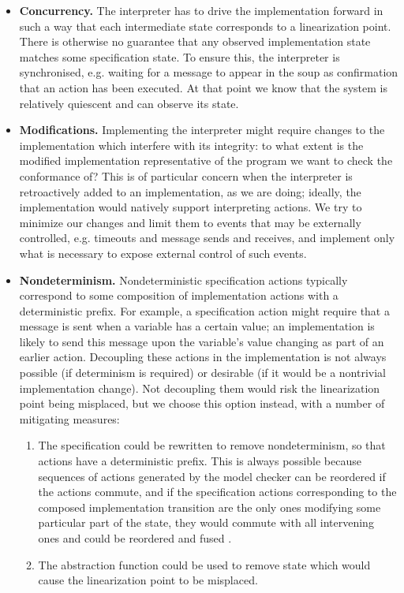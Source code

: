 \documentclass[a4paper]{article}
\begin{document}
\begin{itemize}
\item \textbf{Concurrency.} The interpreter has to drive the implementation forward in such a way that each intermediate state corresponds to a linearization point.
%
There is otherwise no guarantee that any observed implementation state matches some specification state.
%
To ensure this, the interpreter is synchronised, e.g. waiting for a message to appear in the soup as confirmation that an action has been executed.
%
At that point we know that the system is relatively quiescent and can observe its state.

\item \textbf{Modifications.} Implementing the interpreter might require changes to the implementation which interfere with its integrity: to what extent is the modified implementation representative of the program we want to check the conformance of?
%
This is of particular concern when the interpreter is retroactively added to an implementation, as we are doing; ideally, the implementation would natively support interpreting actions.
%
We try to minimize our changes and limit them to events that may be externally controlled, e.g. timeouts and message sends and receives, and implement only what is necessary to expose external control of such events.


\item \textbf{Nondeterminism.} Nondeterministic specification actions typically correspond to some composition of implementation actions with a deterministic prefix.
%
For example, a specification action might require that a message is sent when a variable has a certain value; an implementation is likely to send this message upon the variable's value changing as part of an earlier action.
%
Decoupling these actions in the implementation is not always possible (if determinism is required) or desirable (if it would be a nontrivial implementation change).
%
Not decoupling them would risk the linearization point being misplaced, but we choose this option instead, with a number of mitigating measures:

\begin{enumerate}
\item The specification could be rewritten to remove nondeterminism, so that actions have a deterministic prefix.
%
This is always possible because sequences of actions generated by the model checker can be reordered if the actions commute, and if the specification actions corresponding to the composed implementation transition are the only ones modifying some particular part of the state, they would commute with all intervening ones and could be reordered and fused \cite{lipton1975reduction}.

\item The abstraction function could be used to remove state which would cause the linearization point to be misplaced.
\end{enumerate}

\end{itemize}
\end{document}
